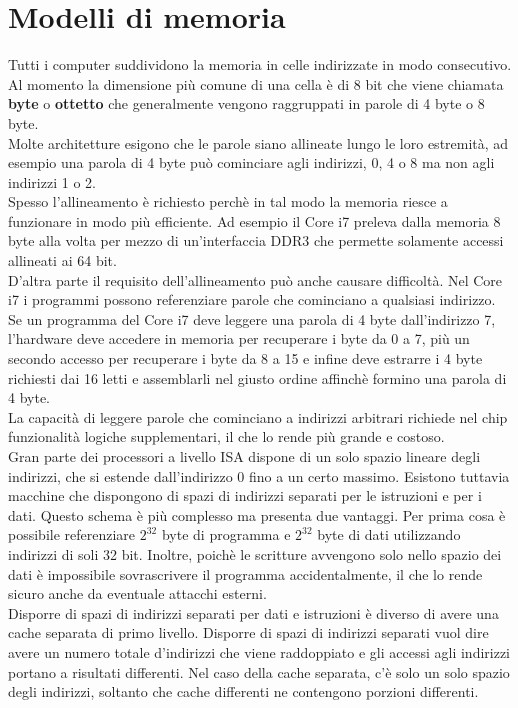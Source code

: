 \documentclass[12pt]{report}
\begin{document}
		\section{Modelli di memoria}
		Tutti i computer suddividono la memoria in celle indirizzate in modo consecutivo. Al momento la dimensione più comune di una cella è di 8 bit che viene chiamata \textbf{byte} o \textbf{ottetto} che generalmente vengono raggruppati in parole di 4 byte o 8 byte.\\
		Molte architetture esigono che le parole siano allineate lungo le loro estremità, ad esempio una parola di 4 byte può cominciare agli indirizzi, 0, 4 o 8 ma non agli indirizzi 1 o 2. \\
		Spesso l'allineamento è richiesto perchè in tal modo la memoria riesce a funzionare in modo più efficiente. Ad esempio il Core i7 preleva dalla memoria 8 byte alla volta per mezzo di un'interfaccia DDR3 che permette solamente accessi allineati ai 64 bit. \\
		D'altra parte il requisito dell'allineamento può anche causare difficoltà. Nel Core i7 i programmi possono referenziare parole che cominciano a qualsiasi indirizzo. Se un programma del Core i7 deve leggere una parola di 4 byte dall'indirizzo 7, l'hardware deve accedere in memoria per recuperare i byte da 0 a 7, più un secondo accesso per recuperare i byte da 8 a 15 e infine deve estrarre i 4 byte richiesti dai 16 letti e assemblarli nel giusto ordine affinchè formino una parola di 4 byte. \\
		La capacità di leggere parole che cominciano a indirizzi arbitrari richiede nel chip funzionalità logiche supplementari, il che lo rende più grande e costoso. \\
		Gran parte dei processori a livello ISA dispone di un solo spazio lineare degli indirizzi, che si estende dall'indirizzo 0 fino a un certo massimo. Esistono tuttavia macchine che dispongono di spazi di indirizzi separati per le istruzioni e per i dati. Questo schema è più complesso ma presenta due vantaggi. Per prima cosa è possibile referenziare $2^{32}$ byte di programma e $2^{32}$ byte di dati utilizzando indirizzi di soli 32 bit. Inoltre, poichè le scritture avvengono solo nello spazio dei dati è impossibile sovrascrivere il programma accidentalmente, il che lo rende sicuro anche da eventuale attacchi esterni. \\
		Disporre di spazi di indirizzi separati per dati e istruzioni è diverso di avere una cache separata di primo livello. Disporre di spazi di indirizzi separati vuol dire avere un numero totale d'indirizzi che viene raddoppiato e gli accessi agli indirizzi portano a risultati differenti. Nel caso della cache separata, c'è solo un solo spazio degli indirizzi, soltanto che cache differenti ne contengono porzioni differenti.
\end{document}
